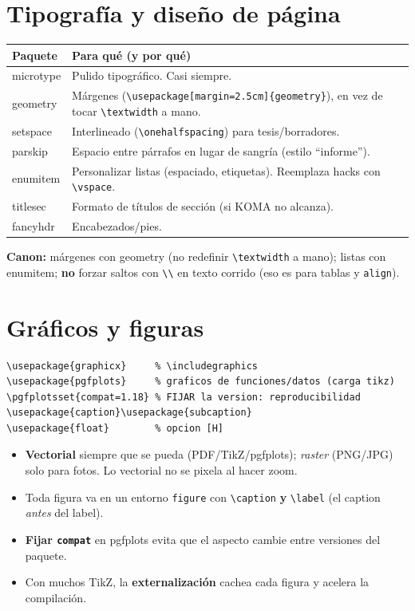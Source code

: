 \documentclass[11pt,a4paper]{article}
\newcommand{\C}[1]{\texttt{\textbackslash #1}}
\newcommand{\pkg}[1]{\textsf{#1}}
\begin{document}
\section{Tipografía y diseño de página}
\begin{center}\small
\renewcommand{\arraystretch}{1.3}
\begin{tabularx}{\linewidth}{@{}l X@{}}
\toprule
\textbf{Paquete} & \textbf{Para qué (y por qué)} \\
\midrule
\pkg{microtype} & Pulido tipográfico. Casi siempre. \\
\pkg{geometry} & Márgenes (\C{usepackage[margin=2.5cm]\{geometry\}}), en vez de tocar \C{textwidth} a mano. \\
\pkg{setspace} & Interlineado (\C{onehalfspacing}) para tesis/borradores. \\
\pkg{parskip} & Espacio entre párrafos en lugar de sangría (estilo \enquote{informe}). \\
\pkg{enumitem} & Personalizar listas (espaciado, etiquetas). Reemplaza hacks con \C{vspace}. \\
\pkg{titlesec} & Formato de títulos de sección (si KOMA no alcanza). \\
\pkg{fancyhdr} & Encabezados/pies. \\
\bottomrule
\end{tabularx}
\end{center}
\textbf{Canon:} márgenes con \pkg{geometry} (no redefinir \C{textwidth} a mano);
listas con \pkg{enumitem}; \textbf{no} forzar saltos con \C{\textbackslash} en
texto corrido (eso es para tablas y \texttt{align}).

\section{Gráficos y figuras}
\begin{lstlisting}
\usepackage{graphicx}     % \includegraphics
\usepackage{pgfplots}     % graficos de funciones/datos (carga tikz)
\pgfplotsset{compat=1.18} % FIJAR la version: reproducibilidad
\usepackage{caption}\usepackage{subcaption}
\usepackage{float}        % opcion [H]
\end{lstlisting}
\begin{itemize}[noitemsep,leftmargin=*]
  \item \textbf{Vectorial} siempre que se pueda (PDF/TikZ/pgfplots); \emph{raster}
        (PNG/JPG) solo para fotos. Lo vectorial no se pixela al hacer zoom.
  \item Toda figura va en un entorno \texttt{figure} con \C{caption}
        \textbf{y} \C{label} (el caption \emph{antes} del label).
  \item \textbf{Fijar \texttt{compat}} en \pkg{pgfplots} evita que el aspecto
        cambie entre versiones del paquete.
  \item Con muchos TikZ, la \textbf{externalización} cachea cada figura y acelera
        la compilación.
\end{itemize}
\end{document}
